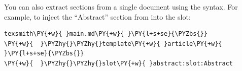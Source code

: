\documentclass[a4paper,twoside]{article}
\begin{document}
You can also extract sections from a single document using the  syntax. For example, to inject the \enquote{Abstract} section from  into the  slot:
\begin{tscode}[lang=bash, engine=pygments]
\begin{Verbatim}[commandchars=\\\{\},breaklines, breakanywhere, commandchars=\\\{\}]
texsmith\PY{+w}{ }main.md\PY{+w}{ }\PY{l+s+se}{\PYZbs{}}
\PY{+w}{  }\PYZhy{}\PYZhy{}template\PY{+w}{ }article\PY{+w}{ }\PY{l+s+se}{\PYZbs{}}
\PY{+w}{  }\PYZhy{}\PYZhy{}slot\PY{+w}{ }abstract:slot:Abstract
\end{Verbatim}
\end{tscode}
\end{document}

